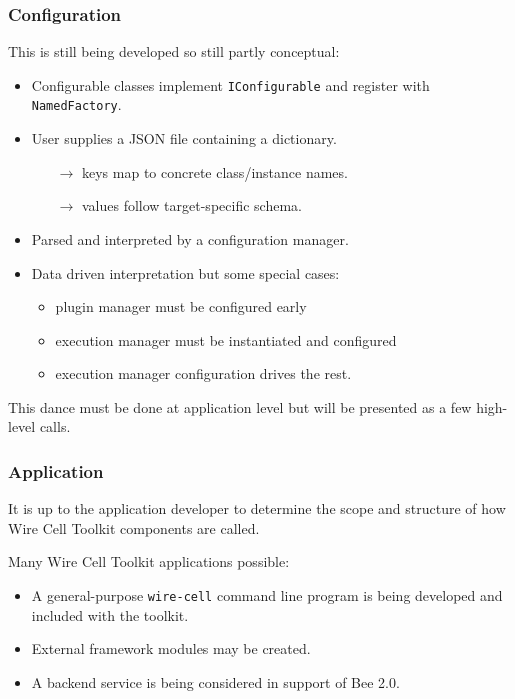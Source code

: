 \documentclass[xcolor=dvipsnames]{beamer}
\begin{document}
\begin{frame}
  \frametitle{Configuration}

  This is still being developed so still partly conceptual:

  \begin{itemize}
  \item Configurable classes implement \texttt{IConfigurable} and register with \texttt{NamedFactory}.
  \item User supplies a JSON file containing a dictionary.
    \begin{itemize}
    \item[$\rightarrow$] keys map to concrete class/instance names.
    \item[$\rightarrow$] values follow target-specific schema.
    \end{itemize}
  \item Parsed and interpreted by a configuration manager.
  \item Data driven interpretation but some special cases:
    \begin{itemize}
    \item plugin manager must be configured early
    \item execution manager must be instantiated and configured
    \item execution manager configuration drives the rest.
    \end{itemize}
  \end{itemize}

  This dance must be done at application level but will be presented
  as a few high-level calls.
\end{frame}

\begin{frame}
  \frametitle{Application}

  It is up to the application developer to determine the scope and
  structure of how Wire Cell Toolkit components are called.

  \vfill

  Many Wire Cell Toolkit applications possible:

  \begin{itemize}
  \item A general-purpose \texttt{wire-cell} command line program is
    being developed and included with the toolkit.
  \item External framework modules may be created.
  \item A backend service is being considered in support of Bee 2.0.
  \end{itemize}

\end{frame}
\end{document}

